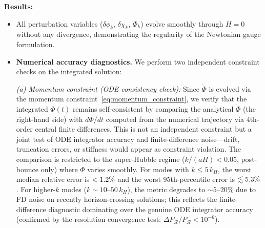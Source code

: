\documentclass[11pt,a4paper]{article}
\begin{document}
\textbf{Results:}
\begin{itemize}
\item All perturbation variables ($\delta\phi_k$, $\delta\chi_k$, $\Phi_k$) evolve smoothly through $H=0$ without any divergence, demonstrating the regularity of the Newtonian gauge formulation.
\item \textbf{Numerical accuracy diagnostics.} We perform two independent constraint checks on the integrated solution:

\textit{(a) Momentum constraint (ODE consistency check):} Since $\dot\Phi$ is evolved via the momentum constraint~\eqref{eq:momentum_constraint}, we verify that the integrated $\Phi(t)$ remains self-consistent by comparing the analytical $\dot\Phi$ (the right-hand side) with $d\Phi/dt$ computed from the numerical trajectory via 4th-order central finite differences. This is not an independent constraint but a joint test of ODE integrator accuracy and finite-difference noise---drift, truncation errors, or stiffness would appear as constraint violation. The comparison is restricted to the super-Hubble regime ($k/(aH) < 0.05$, post-bounce only) where $\Phi$ varies smoothly. For modes with $k \leq 5\,k_H$, the worst median relative error is $< 1.2\%$ and the worst 95th-percentile error is $\lesssim 5.3\%$. For higher-$k$ modes ($k \sim 10$--$50\,k_H$), the metric degrades to $\sim 5$--$20\%$ due to FD noise on recently horizon-crossing solutions; this reflects the finite-difference diagnostic dominating over the genuine ODE integrator accuracy (confirmed by the resolution convergence test: $\Delta P_\mathcal{R}/P_\mathcal{R} < 10^{-6}$).


\end{itemize}
\end{document}
